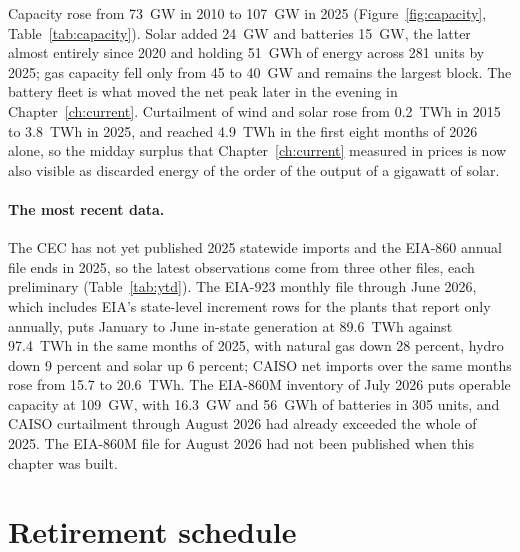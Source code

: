 Capacity rose from 73~GW in 2010 to 107~GW in 2025 (Figure~\ref{fig:capacity}, Table~\ref{tab:capacity}). Solar added 24~GW and batteries 15~GW, the latter almost entirely since 2020 and holding 51~GWh of energy across 281 units by 2025; gas capacity fell only from 45 to 40~GW and remains the largest block. The battery fleet is what moved the net peak later in the evening in Chapter~\ref{ch:current}. Curtailment of wind and solar rose from 0.2~TWh in 2015 to 3.8~TWh in 2025, and reached 4.9~TWh in the first eight months of 2026 alone, so the midday surplus that Chapter~\ref{ch:current} measured in prices is now also visible as discarded energy of the order of the output of a gigawatt of solar.

\paragraph{The most recent data.} The CEC has not yet published 2025 statewide imports and the EIA-860 annual file ends in 2025, so the latest observations come from three other files, each preliminary (Table~\ref{tab:ytd}). The EIA-923 monthly file through June 2026, which includes EIA's state-level increment rows for the plants that report only annually, puts January to June in-state generation at 89.6~TWh against 97.4~TWh in the same months of 2025, with natural gas down 28 percent, hydro down 9 percent and solar up 6 percent; CAISO net imports over the same months rose from 15.7 to 20.6~TWh. The EIA-860M inventory of July 2026 puts operable capacity at 109~GW, with 16.3~GW and 56~GWh of batteries in 305 units, and CAISO curtailment through August 2026 had already exceeded the whole of 2025. The EIA-860M file for August 2026 had not been published when this chapter was built.

\begin{table}[H]
\centering\footnotesize
\caption{January to June generation by resource, 2025 final against 2026 preliminary, and CAISO net imports over the same months. Source: EIA-923 annual 2025 and monthly June 2026 files, EIA-930.}
\label{tab:ytd}

\end{table}

\section{Retirement schedule}
\label{sec:retirements}

